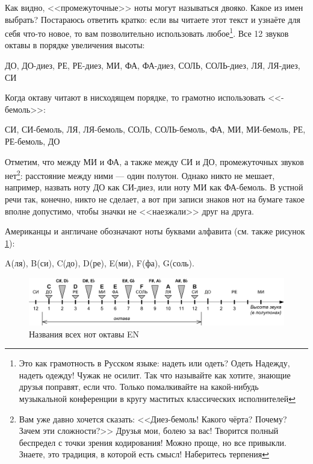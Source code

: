 Как видно, <<промежуточные>> ноты могут называться двояко. Какое из имен выбрать? Постараюсь ответить кратко: если вы читаете этот текст и узнаёте для себя что-то новое, то вам позволительно использовать любое\footnote{Это как грамотность в Русском языке: надеть или одеть? Одеть Надежду, надеть одежду! Чужак не осилит. Так что называйте как хотите, знающие друзья поправят, если что. Только помалкивайте на какой-нибудь музыкальной конференции в кругу маститых классических исполнителей}. Все 12 звуков октавы в порядке увеличения высоты:
\begin{center}
    ДО, ДО-диез, РЕ, РЕ-диез, МИ, ФА, ФА-диез, СОЛЬ, СОЛЬ-диез, ЛЯ, ЛЯ-диез, СИ
\end{center}

Когда октаву читают в нисходящем порядке, то грамотно использовать <<-бемоль>>:
\begin{center}
    СИ, СИ-бемоль, ЛЯ, ЛЯ-бемоль, СОЛЬ, СОЛЬ-бемоль, ФА, МИ, МИ-бемоль, РЕ, РЕ-бемоль, ДО
\end{center}

Отметим, что между МИ и ФА, а также между СИ и ДО, промежуточных звуков нет\footnote{Вам уже давно хочется сказать: <<Диез-бемоль! Какого чёрта? Почему? Зачем эти сложности?>> Друзья мои, болею за вас! Творится полный беспредел с точки зрения кодирования! Можно проще, но все привыкли. Знаете, это традиция, в которой есть смысл! Наберитесь терпения}: расстояние между ними --- один полутон. Однако никто не мешает, например, назвать ноту ДО как СИ-диез, или ноту МИ как ФА-бемоль. В устной речи так, конечно, никто не сделает, а вот при записи знаков нот на бумаге такое вполне допустимо, чтобы значки не <<наезжали>> друг на друга.

Американцы и англичане обозначают ноты буквами алфавита (см. также рисунок \ref{fig:notes:names:all:EN}):
\begin{center}
    A(ля), B(си), C(до), D(ре), E(ми), F(фа), G(соль).
\end{center}

\begin{figure}[!ht]
    \centering
    \includegraphics[width=\textwidth]{fig/notes/notes-all-en} 
    \caption{Названия всех нот октавы EN}\label{fig:notes:names:all:EN}
\end{figure} 

